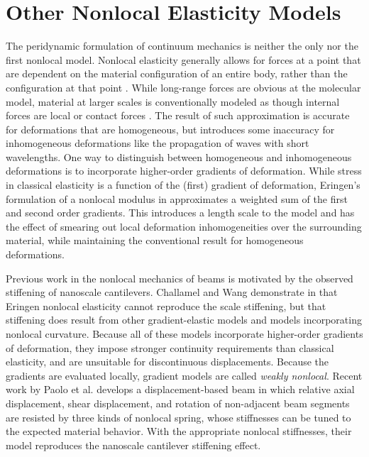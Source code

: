 \section{Other Nonlocal Elasticity Models}
\label{sec:NLbeams}
%
The peridynamic formulation of continuum mechanics is neither the only nor the first nonlocal model. Nonlocal elasticity generally allows for forces at a point that are dependent on the material configuration of an entire body, rather than the configuration at that point \cite{eringen1972nonlocal}.  While long-range forces are obvious at the molecular model, material at larger scales is conventionally modeled as though internal forces are local or contact forces \cite{kroner1967elasticity}.
The result of such approximation is accurate for deformations that are homogeneous, but introduces some inaccuracy for inhomogeneous deformations like the propagation of waves with short wavelengths.
One way to distinguish between homogeneous and inhomogeneous deformations is to incorporate higher-order gradients of deformation.
While stress in classical elasticity is a function of the (first) gradient of deformation, Eringen's formulation of a nonlocal modulus in \cite{eringen1983differential} approximates a weighted sum of the first and second order gradients.
This introduces a length scale to the model and has the effect of smearing out local deformation inhomogeneities over the surrounding material, while maintaining the conventional result for homogeneous deformations.

Previous work in the nonlocal mechanics of beams is motivated by the observed stiffening of nanoscale cantilevers.
Challamel and Wang demonstrate in \cite{Challamel2008small} that Eringen nonlocal elasticity cannot reproduce the scale stiffening, but that stiffening does result from other gradient-elastic models and models incorporating nonlocal curvature.
Because all of these models incorporate higher-order gradients of deformation, they impose stronger continuity requirements than classical elasticity, and are unsuitable for discontinuous displacements.
Because the gradients are evaluated locally, gradient models are called \textit{weakly nonlocal}.
Recent work by Paolo et al. \cite{paola2013mechanically} develops a displacement-based beam in which relative axial displacement, shear displacement, and rotation of non-adjacent beam segments are resisted by three kinds of nonlocal spring, whose stiffnesses can be tuned to the expected material behavior.
With the appropriate nonlocal stiffnesses, their model reproduces the nanoscale cantilever stiffening effect.

